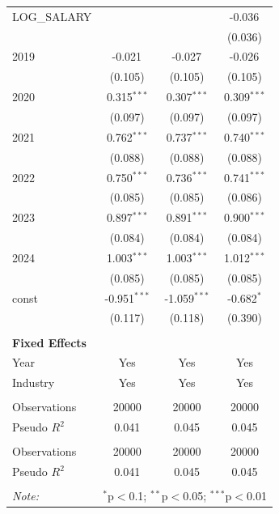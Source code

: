 \begin{table}[!htbp]
\begin{tabular}{@{\extracolsep{5pt}}lccc}
 LOG_SALARY & & & -0.036$^{}$ \\
& & & (0.036) \\
 2019 & -0.021$^{}$ & -0.027$^{}$ & -0.026$^{}$ \\
& (0.105) & (0.105) & (0.105) \\
 2020 & 0.315$^{***}$ & 0.307$^{***}$ & 0.309$^{***}$ \\
& (0.097) & (0.097) & (0.097) \\
 2021 & 0.762$^{***}$ & 0.737$^{***}$ & 0.740$^{***}$ \\
& (0.088) & (0.088) & (0.088) \\
 2022 & 0.750$^{***}$ & 0.736$^{***}$ & 0.741$^{***}$ \\
& (0.085) & (0.085) & (0.086) \\
 2023 & 0.897$^{***}$ & 0.891$^{***}$ & 0.900$^{***}$ \\
& (0.084) & (0.084) & (0.084) \\
 2024 & 1.003$^{***}$ & 1.003$^{***}$ & 1.012$^{***}$ \\
& (0.085) & (0.085) & (0.085) \\
 const & -0.951$^{***}$ & -1.059$^{***}$ & -0.682$^{*}$ \\
& (0.117) & (0.118) & (0.390) \\
 \hline &  &  &  \\
 \textbf{Fixed Effects} &  &  &  \\
 \quad Year & Yes & Yes & Yes \\
 \quad Industry & Yes & Yes & Yes \\
 \hline &  &  &  \\
 Observations & 20000 & 20000 & 20000 \\
 Pseudo $R^2$ & 0.041 & 0.045 & 0.045 \\
\hline \\[-1.8ex]
 Observations & 20000 & 20000 & 20000 \\
 Pseudo $R^2$ & 0.041 & 0.045 & 0.045 \\
\hline
\hline \\[-1.8ex]
\textit{Note:} & \multicolumn{3}{r}{$^{*}$p$<$0.1; $^{**}$p$<$0.05; $^{***}$p$<$0.01} \\
\end{tabular}
\end{table}